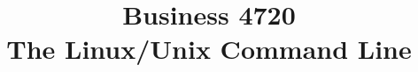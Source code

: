 \documentclass{article}
\title{Business 4720\\ \vspace{\baselineskip}
The Linux/Unix Command Line}
\begin{document}
\maketitle

\vfill

\clearpage


\end{document}

